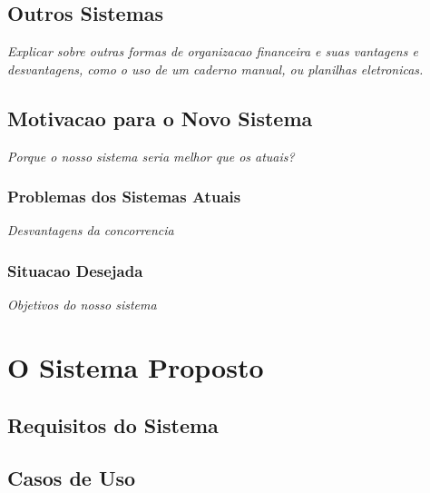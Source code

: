 \documentclass[a4paper]{abnt}
\begin{document}
\section{Outros Sistemas}
\emph{Explicar sobre outras formas de organizacao financeira e suas vantagens e desvantagens, como o uso de um caderno manual, ou planilhas eletronicas.}

\section{Motivacao para o Novo Sistema}
\emph{Porque o nosso sistema seria melhor que os atuais?}

\subsection{Problemas dos Sistemas Atuais}
\emph{Desvantagens da concorrencia}

\subsection{Situacao Desejada}
\emph{Objetivos do nosso sistema}

\chapter{O Sistema Proposto}

\section{Requisitos do Sistema}

\section{Casos de Uso}

\end{document}
